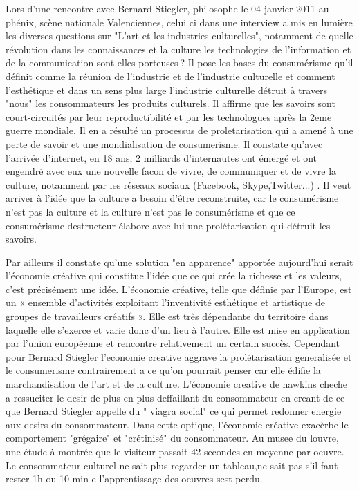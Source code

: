 \documentclass[a4paper,10pt]{article}
\begin{document}
Lors d'une rencontre avec Bernard Stiegler, philosophe le 04 janvier 2011 au phénix, scène nationale Valenciennes, celui ci dans une interview a mis en lumière les diverses questions sur  "L'art et les industries culturelles", notamment de quelle révolution dans les connaissances et la culture les technologies de l’information et de la communication sont-elles porteuses ?
Il pose les bases du consumérisme qu'il définit comme la réunion de l'industrie et de l'industrie culturelle et comment l'esthétique et dans un sens plus large l'industrie culturelle détruit à travers "nous" les consommateurs les produits culturels. Il affirme que les savoirs sont court-circuités par leur reproductibilité et par les technologues après la 2eme guerre mondiale. Il en a résulté un processus de proletarisation qui a amené à une perte de savoir et une mondialisation de consumerisme. Il constate qu'avec l'arrivée d'internet, en 18 ans, 2 milliards d'internautes ont émergé et ont engendré avec eux une nouvelle facon de vivre, de communiquer et de vivre la culture, notamment par les réseaux sociaux (Facebook, Skype,Twitter...) . Il veut arriver à l'idée que la culture a besoin d'être reconstruite, car le consumérisme n'est pas la culture et la culture n'est pas le consumérisme et que ce consumérisme destructeur élabore avec lui une prolétarisation qui détruit les savoirs.

Par ailleurs il constate qu'une solution "en apparence" apportée aujourd'hui serait l'économie créative qui constitue l'idée que ce qui crée la richesse et les valeurs, c'est précisément une idée. L'économie créative, telle que définie par l'Europe, est un « ensemble d'activités exploitant l'inventivité esthétique et artistique de groupes de travailleurs créatifs ». Elle est très dépendante du territoire dans laquelle elle s'exerce et varie donc d'un lieu à l'autre. Elle est mise en application par l'union européenne et rencontre relativement un certain succès. Cependant pour Bernard Stiegler l'economie creative aggrave la prolétarisation generalisée et le consumerisme contrairement a ce qu'on pourrait penser car elle édifie la marchandisation de l’art et de la culture. L'économie creative de hawkins cheche a ressuciter le desir de plus en plus deffaillant du consommateur en creant de ce que Bernard Stiegler appelle du " viagra social"  ce qui permet redonner energie aux desirs du consommateur. Dans cette optique, l'économie créative exacèrbe le comportement "grégaire" et "crétinisé" du consommateur. Au musee du louvre, une étude à montrée que le visiteur passait 42 secondes en moyenne par oeuvre. Le consommateur culturel ne sait plus regarder un tableau,ne sait pas s'il faut rester 1h ou 10 min e l'apprentissage des oeuvres sest perdu.
\end{document}
